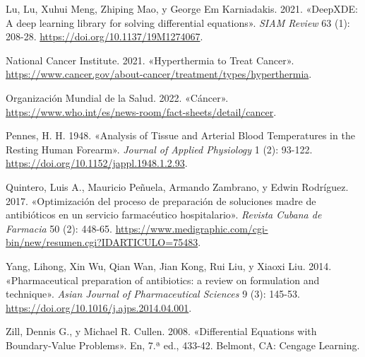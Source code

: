 \documentclass[
  spanish,
  us-letterpaper,
  DIV=11,
  numbers=noendperiod]{scrreprt}
\newlength{\cslhangindent}
\newenvironment{CSLReferences}[2] %
 {\begin{list}{}{%
  \setlength{\itemindent}{0pt}
  \setlength{\leftmargin}{0pt}
  \setlength{\parsep}{0pt}
  \ifodd #1
   \setlength{\leftmargin}{\cslhangindent}
   \setlength{\itemindent}{-1\cslhangindent}
  \fi
  \setlength{\itemsep}{#2\baselineskip}}}
 {\end{list}}
\theoremstyle{plain}
\theoremstyle{definition}
\theoremstyle{remark}
\begin{document}
\begin{CSLReferences}{1}{0}
Lu, Lu, Xuhui Meng, Zhiping Mao, y George Em Karniadakis. 2021.
{«{DeepXDE}: A deep learning library for solving differential
equations»}. \emph{SIAM Review} 63 (1): 208-28.
\url{https://doi.org/10.1137/19M1274067}.

National Cancer Institute. 2021. {«{Hyperthermia to Treat Cancer}»}.
\url{https://www.cancer.gov/about-cancer/treatment/types/hyperthermia}.

Organización Mundial de la Salud. 2022. {«{Cáncer}»}.
\url{https://www.who.int/es/news-room/fact-sheets/detail/cancer}.

Pennes, H. H. 1948. {«Analysis of Tissue and Arterial Blood Temperatures
in the Resting Human Forearm»}. \emph{Journal of Applied Physiology} 1
(2): 93-122. \url{https://doi.org/10.1152/jappl.1948.1.2.93}.

Quintero, Luis A., Mauricio Peñuela, Armando Zambrano, y Edwin
Rodríguez. 2017. {«Optimización del proceso de preparación de soluciones
madre de antibióticos en un servicio farmacéutico hospitalario»}.
\emph{Revista Cubana de Farmacia} 50 (2): 448-65.
\url{https://www.medigraphic.com/cgi-bin/new/resumen.cgi?IDARTICULO=75483}.

Yang, Lihong, Xin Wu, Qian Wan, Jian Kong, Rui Liu, y Xiaoxi Liu. 2014.
{«Pharmaceutical preparation of antibiotics: a review on formulation and
technique»}. \emph{Asian Journal of Pharmaceutical Sciences} 9 (3):
145-53. \url{https://doi.org/10.1016/j.ajps.2014.04.001}.

Zill, Dennis G., y Michael R. Cullen. 2008. {«Differential Equations
with Boundary-Value Problems»}. En, 7.ª ed., 433-42. Belmont, CA:
Cengage Learning.

\end{CSLReferences}
\end{document}
